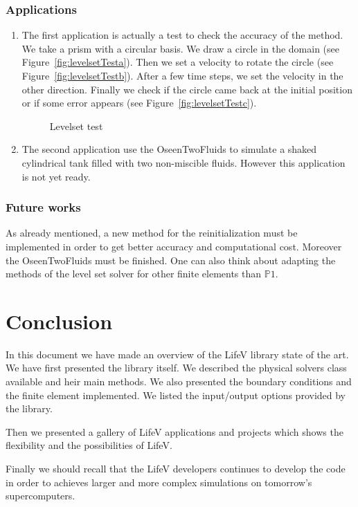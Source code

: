 \documentclass[11pt]{article}
\begin{document}
\subsubsection{Applications}
\begin{enumerate}
\item The first application is actually a test to check the accuracy of the method. We take a prism with a circular basis. We draw a circle in the domain (see Figure~\ref{fig:levelsetTesta}). Then we set a velocity to rotate the circle (see Figure~\ref{fig:levelsetTestb}). After a few time steps, we set the velocity in the other direction. Finally we check if the circle came back at the initial position or if some error appears  (see Figure~\ref{fig:levelsetTestc}).
\begin{figure}[H]
\centering
{}
\caption{Levelset test}
\label{fig:levelsetTest}
\end{figure}

\item The second application use the OseenTwoFluids to simulate a shaked cylindrical tank filled with two non-miscible fluids. However this application is not yet ready.
\end{enumerate}

\subsubsection{Future works}
As already mentioned, a new method for the reinitialization must be implemented in order to get better accuracy and computational cost. Moreover the OseenTwoFluids must be finished. One can also think about adapting the methods of the level set solver for other finite elements than $\mathbb{P}1$.

\section{Conclusion}
In this document we have made an overview of the LifeV library state of the art. We have first presented the library itself. We described the physical solvers class available and heir main methods. We also presented the boundary conditions and the finite element implemented. We listed the input/output options provided by the library.

Then we presented a gallery of LifeV applications and projects which shows the flexibility and the possibilities of LifeV.

Finally we should recall that the LifeV developers continues to develop the code in order to achieves larger and more complex simulations on tomorrow's supercomputers.

\newpage
\nocite{*}


\end{document}
